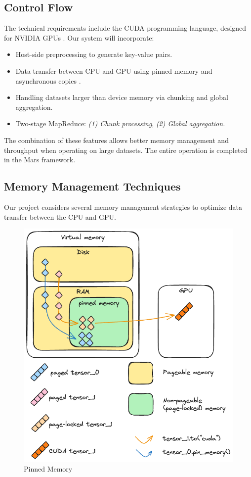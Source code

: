 \documentclass{article}
\begin{document}
\subsection{Control Flow}
The technical requirements include the CUDA programming language, designed for NVIDIA GPUs \cite{cuda_docs}. Our system will incorporate:
\begin{itemize}
    \item Host-side preprocessing to generate key-value pairs.
    \item Data transfer between CPU and GPU using pinned memory and asynchronous copies \cite{cuda_mem_pool}.
    \item Handling datasets larger than device memory via chunking and global aggregation.
    \item Two-stage MapReduce: \textit{(1) Chunk processing}, \textit{(2) Global aggregation.}
\end{itemize}

The combination of these features allows better memory management and throughput when operating on large datasets. The entire operation is completed in the Mars framework. 

\subsection{Memory Management Techniques}
Our project considers several memory management strategies to optimize data transfer between the CPU and GPU.

\begin{figure}[ht]
    \centering
    \includegraphics[width=.8\linewidth]{./images/pinmem.png}
    \caption{Pinned Memory \cite{pinned_memory}}
    \label{fig:mapreduce}
\end{figure}
\end{document}
